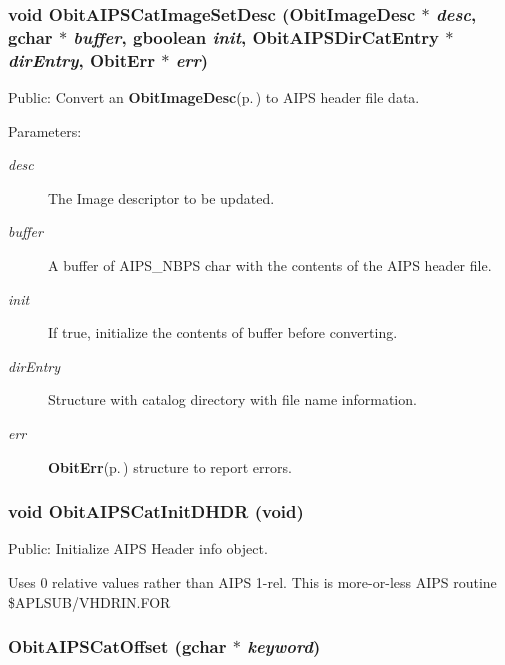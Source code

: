\subsubsection{\setlength{\rightskip}{0pt plus 5cm}void Obit\-AIPSCat\-Image\-Set\-Desc ({\bf Obit\-Image\-Desc} $\ast$ {\em desc}, gchar $\ast$ {\em buffer}, gboolean {\em init}, {\bf Obit\-AIPSDir\-Cat\-Entry} $\ast$ {\em dir\-Entry}, {\bf Obit\-Err} $\ast$ {\em err})}\label{ObitAIPSCat_8h_a1}


Public: Convert an {\bf Obit\-Image\-Desc}{\rm (p.\,\pageref{structObitImageDesc})} to AIPS header file data. 

\begin{Desc}
\item[Parameters:]
\begin{description}
\item[{\em desc}]The Image descriptor to be updated. \item[{\em buffer}]A buffer of AIPS\_\-NBPS char with the contents of the AIPS header file. \item[{\em init}]If true, initialize the contents of buffer before converting. \item[{\em dir\-Entry}]Structure with catalog directory with file name information. \item[{\em err}]{\bf Obit\-Err}{\rm (p.\,\pageref{structObitErr})} structure to report errors. \end{description}
\end{Desc}
\subsubsection{\setlength{\rightskip}{0pt plus 5cm}void Obit\-AIPSCat\-Init\-DHDR (void)}\label{ObitAIPSCat_8h_a8}


Public: Initialize AIPS Header info object. 

Uses 0 relative values rather than AIPS 1-rel. This is more-or-less AIPS routine \$APLSUB/VHDRIN.FOR 
\subsubsection{ Obit\-AIPSCat\-Offset (gchar $\ast$ {\em keyword})}\label{ObitAIPSCat_8h_a9}


